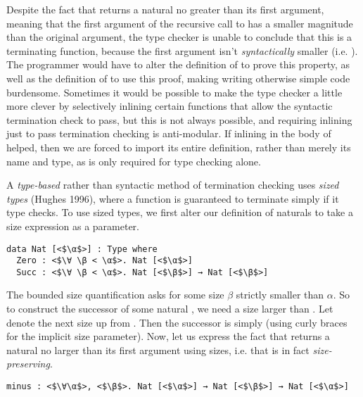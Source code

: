 \documentclass[acmsmall,nonacm]{acmart}
\newcommand{\α}{\alpha}
\newcommand{\β}{\beta}
\newcommand{\γ}{\gamma}
\newcommand{\σ}{\sigma}
\newcommand{\Γ}{\Gamma}
\newcommand{\Λ}{\Lambda}
\newcommand{\∀}{\forall}
\newcommand{\↑}{\uparrow}
\newcommand{\⊢}{\vdash}
\newcommand{\↦}{\mapsto}
\newcommand{\⊳}{\rhd}
\begin{document}
Despite the fact that  returns a natural no greater than its first argument,
meaning that the first argument of the recursive call to  has a smaller magnitude
than the original argument,
the type checker is unable to conclude that this is a terminating function,
because the first argument isn't \emph{syntactically} smaller (i.e. ).
The programmer would have to alter the definition of  to prove this property,
as well as the definition of  to use this proof, making writing otherwise simple code burdensome.
Sometimes it would be possible to make the type checker a little more clever by selectively inlining
certain functions that allow the syntactic termination check to pass,
but this is not always possible, and requiring inlining just to pass termination checking is anti-modular.
If inlining  in the body of  helped, then we are forced to import its entire definition,
rather than merely its name and type, as is only required for type checking alone.

A \emph{type-based} rather than syntactic method of termination checking uses \emph{sized types} (Hughes 1996),
where a function is guaranteed to terminate simply if it type checks.
To use sized types, we first alter our definition of naturals to take a size expression as a parameter.

\begin{verbatim}
data Nat [<$\α$>] : Type where
  Zero : <$\∀ \β < \α$>. Nat [<$\α$>]
  Succ : <$\∀ \β < \α$>. Nat [<$\β$>] → Nat [<$\β$>]
\end{verbatim}

The bounded size quantification \agda{<$\∀\β < \α$>} asks for some size $\β$ strictly smaller than $\α$.
So to construct the successor of some natural , we need a size larger than .
Let \agda{<$\↑$>s} denote the next size up from .
Then the successor is simply \agda{Succ {<$\↑$>s} [s] n} (using curly braces for the implicit size parameter).
Now, let us express the fact that  returns a natural no larger than its first argument using sizes,
i.e. that  is in fact \emph{size-preserving}.

\begin{verbatim}
minus : <$\∀\α$>, <$\β$>. Nat [<$\α$>] → Nat [<$\β$>] → Nat [<$\α$>]
\end{verbatim}
\end{document}
